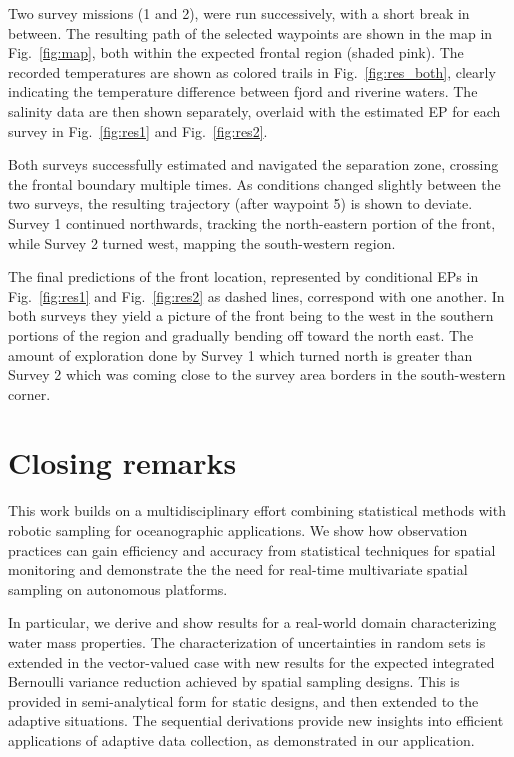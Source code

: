 \documentclass[aoas]{imsart}
\begin{document}
Two survey missions (1 and 2), were run successively, with a short
break in between. The resulting path of the selected waypoints are
shown in the map in Fig.~\ref{fig:map}, both within the expected
frontal region (shaded pink). The recorded temperatures are shown as
colored trails in Fig.~\ref{fig:res_both}, clearly indicating the
temperature difference between fjord and riverine waters. The salinity
data are then shown separately, overlaid with the estimated EP for
each survey in Fig.~\ref{fig:res1} and Fig.~\ref{fig:res2}.

Both surveys successfully estimated and navigated the separation zone,
crossing the frontal boundary multiple times. As conditions changed
slightly between the two surveys, the resulting trajectory (after
waypoint 5) is shown to deviate. Survey 1 continued northwards,
tracking the north-eastern portion of the front, while Survey 2 turned
west, mapping the south-western region.

The final predictions of the front location, represented by
conditional EPs in Fig.~\ref{fig:res1} and Fig.~\ref{fig:res2} as
dashed lines, correspond with one another. In both surveys they yield
a picture of the front being to the west in the southern portions of
the region and gradually bending off toward the north east. The amount
of exploration done by Survey 1 which turned north is greater than
Survey 2 which was coming close to the survey area borders in the
south-western corner.

\section{Closing remarks}
\label{sec:concl_disc}

This work builds on a multidisciplinary effort combining statistical
methods with robotic sampling for oceanographic applications. We show
how observation practices can gain efficiency and accuracy from
statistical techniques for spatial monitoring and demonstrate the the
need for real-time multivariate spatial sampling on autonomous
platforms.%

In particular, we derive and show results for a real-world domain
characterizing water mass properties. The characterization of
uncertainties in random sets is extended in the vector-valued case
with new results for the expected integrated Bernoulli variance
reduction achieved by spatial sampling designs. This is provided in
semi-analytical form for static designs, and then extended to the
adaptive situations. The sequential derivations provide new insights
into efficient applications of adaptive data collection, as
demonstrated in our application.
\end{document}
